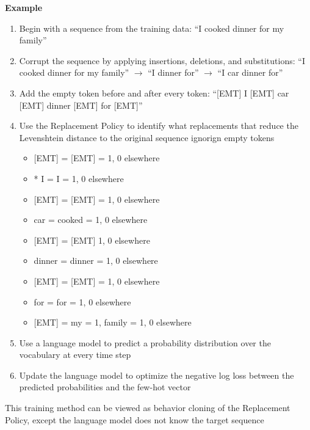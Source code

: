 \documentclass{article}
\begin{document}
\noindent \textbf{Example}
\begin{enumerate}
    \item{Begin with a sequence from the training data: “I cooked dinner for my family”}
    \item{Corrupt the sequence by applying insertions, deletions, and substitutions: “I cooked dinner for my family” $\rightarrow$ “I dinner for” $\rightarrow$ “I car dinner for”}
    \item{Add the empty token before and after every token: “[EMT] I [EMT] car [EMT] dinner [EMT] for [EMT]”}
    \item{Use the Replacement Policy to identify what replacements that reduce the Levenshtein distance to the original sequence ignorign empty tokens}
    \begin{itemize}
            \item{[EMT] = { [EMT] = 1, 0 elsewhere }}
            \item{* I = { I = 1, 0 elsewhere }}
            \item{[EMT] = { [EMT] = 1, 0 elsewhere }}
            \item{car = { cooked = 1, 0 elsewhere }}
            \item{[EMT] = { [EMT] 1, 0 elsewhere }}
            \item{dinner = { dinner = 1, 0 elsewhere }}
            \item{[EMT] = { [EMT] = 1, 0 elsewhere }}
            \item{for = { for = 1, 0 elsewhere }}
            \item{[EMT] = { my = 1, family = 1, 0 elsewhere }}
    \end{itemize}

    \item{Use a language model to predict a probability distribution over the vocabulary at every time step}
    \item{Update the language model to optimize the negative log loss between the predicted probabilities and the few-hot vector}
\end{enumerate}
        
This training method can be viewed as behavior cloning of the Replacement Policy, except the language model does not know the target sequence
\end{document}
